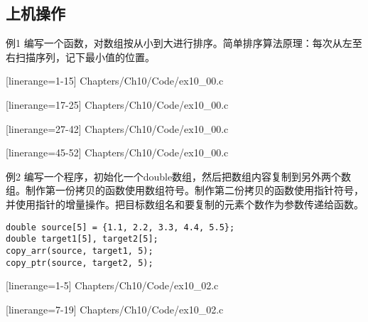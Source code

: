\subsection{上机操作}

\begin{frame}[fragile]\ft{\subsecname}
\begin{block}{例1}
编写一个函数，对数组按从小到大进行排序。简单排序算法原理：每次从左至右扫描序列，记下最小值的位置。
\end{block}
\end{frame}


\begin{frame}[fragile]\ft{\subsecname}

[linerange={1-15}]
{Chapters/Ch10/Code/ex10_00.c}
\end{frame}

\begin{frame}[fragile]\ft{\subsecname}

[linerange={17-25}]
{Chapters/Ch10/Code/ex10_00.c}
\end{frame}

\begin{frame}[fragile]\ft{\subsecname}

[linerange={27-42}]
{Chapters/Ch10/Code/ex10_00.c}
\end{frame}

\begin{frame}[fragile]\ft{\subsecname}

[linerange={45-52}]
{Chapters/Ch10/Code/ex10_00.c}
\end{frame}

\begin{frame}[fragile]\ft{\subsecname}
\begin{block}{例2}
编写一个程序，初始化一个double数组，然后把数组内容复制到另外两个数组。制作第一份拷贝的函数使用数组符号。制作第二份拷贝的函数使用指针符号，并使用指针的增量操作。把目标数组名和要复制的元素个数作为参数传递给函数。
\begin{lstlisting}
double source[5] = {1.1, 2.2, 3.3, 4.4, 5.5};
double target1[5], target2[5];
copy_arr(source, target1, 5);
copy_ptr(source, target2, 5);
\end{lstlisting}
\end{block}
\end{frame}

\begin{frame}[fragile]\ft{\subsecname}

[linerange={1-5}]
{Chapters/Ch10/Code/ex10_02.c}
\end{frame}

\begin{frame}[fragile]\ft{\subsecname}

[linerange={7-19}]
{Chapters/Ch10/Code/ex10_02.c}
\end{frame}

